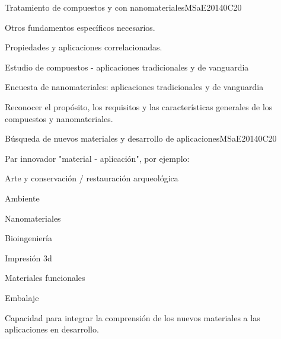 \begin{syllabus}
\begin{unit}{Tratamiento de compuestos y con nanomateriales}{}{MSaE2014}{0}{C20}
\begin{topics}
      \item Otros fundamentos específicos necesarios.
      \item Propiedades y aplicaciones correlacionadas.
      \item Estudio de compuestos - aplicaciones tradicionales y de vanguardia
      \item Encuesta de nanomateriales: aplicaciones tradicionales y de vanguardia
\end{topics}
   \begin{learningoutcomes}
      \item Reconocer el propósito, los requisitos y las características generales de los compuestos y nanomateriales.
   \end{learningoutcomes}
\end{unit}

\begin{unit}{Búsqueda de nuevos materiales y desarrollo de aplicaciones}{}{MSaE2014}{0}{C20}
\begin{topics}
      \item Par innovador  "material - aplicación", por ejemplo:
	  \begin{subtopics}
	    \item  Arte y conservación / restauración arqueológica
	    \item  Ambiente
	    \item  Nanomateriales
	    \item  Bioingeniería
	    \item  Impresión 3d
	    \item  Materiales funcionales
	    \item  Embalaje
	  \end{subtopics}  
\end{topics}
   \begin{learningoutcomes}
      \item Capacidad para integrar la comprensión de los nuevos materiales a las aplicaciones en desarrollo.
   \end{learningoutcomes}
\end{unit}














\begin{coursebibliography}
\end{coursebibliography}
\end{syllabus}
